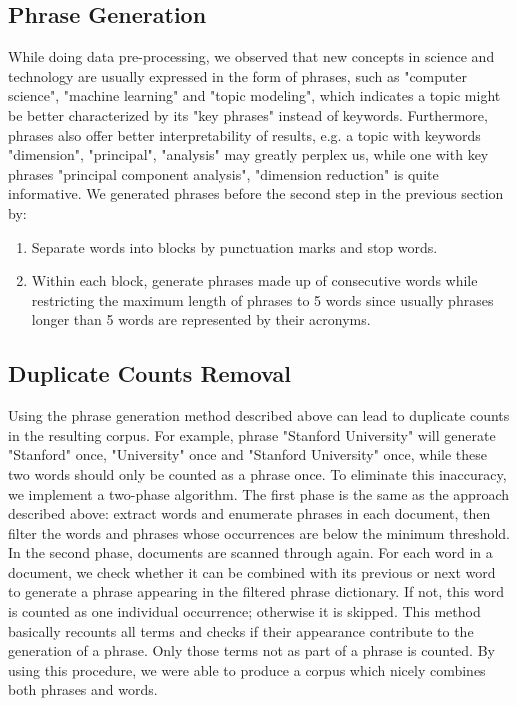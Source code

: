 \documentclass[DIV=calc, paper=letter, fontsize=10pt, twocolumn]{scrartcl}	 %
\begin{document}
\subsection*{Phrase Generation}
While doing data pre-processing, we observed that new concepts in science and technology are usually expressed in the form of phrases, such as "computer science", "machine learning" and "topic modeling", which indicates a topic might be better characterized by its "key phrases" instead of keywords. Furthermore, phrases also offer better interpretability of results, e.g. a topic with keywords {"dimension", "principal", "analysis"} may greatly perplex us, while one with key phrases {"principal component analysis", "dimension reduction"} is quite informative.\newline \newline
We generated phrases before the second step in the previous section by:
\begin{enumerate}
  \item Separate words into blocks by punctuation marks and stop words.
  \item Within each block, generate phrases made up of consecutive words while restricting the maximum length of phrases to 5 words since usually phrases longer than 5 words are represented by their acronyms.
\end{enumerate}
\subsection*{Duplicate Counts Removal}
Using the phrase generation method described above can lead to duplicate counts in the resulting corpus. For example, phrase "Stanford University" will generate "Stanford" once, "University" once and "Stanford University" once, while these two words should only be counted as a phrase once. \newline \newline
To eliminate this inaccuracy, we implement a two-phase algorithm. The first phase is the same as the approach described above: extract words and enumerate phrases in each document, then filter the words and phrases whose occurrences are below the minimum threshold. In the second phase, documents are scanned through again. For each word in a document, we check whether it can be combined with its previous or next word to generate a phrase appearing in the filtered phrase dictionary. If not, this word is counted as one individual occurrence; otherwise it is skipped. This method basically recounts all terms and checks if their appearance contribute to the generation of a phrase. Only those terms not as part of a phrase is counted. By using this procedure, we were able to produce a corpus which nicely combines both phrases and words. 
\end{document}

